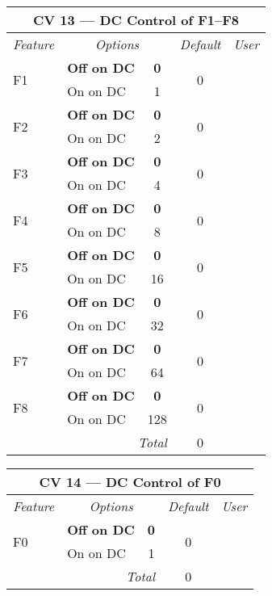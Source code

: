 \documentclass[12pt,letterpaper,draft]{memoir} %
\begin{document}
\label{CV13}
\begin{center}
\begin{tabular}{|l|lc|c|c|}
\hline
\multicolumn{5}{|c|}{\textbf{CV 13 --- DC Control of F1--F8}} \\ \hline \hline
\textit{Feature} & \multicolumn{2}{c|}{\textit{Options}} & \textit{Default} & \textit{User} \\ \hline
\multirow{2}{*}{F1} & \textbf{Off on DC} & \textbf{0}	& 	\multirow{2}{*}{0}& \\
                           & On on DC & 1 & & \\ \hline
\multirow{2}{*}{F2} & \textbf{Off on DC} & \textbf{0}	& 	\multirow{2}{*}{0}& \\
                           & On on DC & 2 & & \\ \hline
\multirow{2}{*}{F3} & \textbf{Off on DC} & \textbf{0}	& 	\multirow{2}{*}{0}& \\
                           & On on DC & 4 & & \\ \hline
\multirow{2}{*}{F4} & \textbf{Off on DC} & \textbf{0}	& 	\multirow{2}{*}{0}& \\
                           & On on DC & 8 & & \\ \hline
\multirow{2}{*}{F5} & \textbf{Off on DC} & \textbf{0}	& 	\multirow{2}{*}{0}& \\
                           & On on DC & 16 & & \\ \hline
\multirow{2}{*}{F6} & \textbf{Off on DC} & \textbf{0}	& 	\multirow{2}{*}{0}& \\
                           & On on DC & 32 & & \\ \hline
\multirow{2}{*}{F7} & \textbf{Off on DC} & \textbf{0}	& 	\multirow{2}{*}{0}& \\
                           & On on DC & 64 & & \\ \hline
\multirow{2}{*}{F8} & \textbf{Off on DC} & \textbf{0}	& 	\multirow{2}{*}{0}& \\
                           & On on DC & 128 & & \\ \hline\hline
\multicolumn{3}{|r|}{\textit{Total}} & 0 &\\ \hline
\end{tabular}
\end{center}

\label{CV14}
\begin{center}
\begin{tabular}{|l|lc|c|c|}
\hline
\multicolumn{5}{|c|}{\textbf{CV 14 --- DC Control of F0}} \\ \hline \hline
\textit{Feature} & \multicolumn{2}{c|}{\textit{Options}} & \textit{Default} & \textit{User} \\ \hline
\multirow{2}{*}{F0} & \textbf{Off on DC} & \textbf{0}	& 	\multirow{2}{*}{0}& \\
                           & On on DC & 1 & & \\ \hline\hline
\multicolumn{3}{|r|}{\textit{Total}} & 0 &\\ \hline
\end{tabular}
\end{center}
\end{document}
